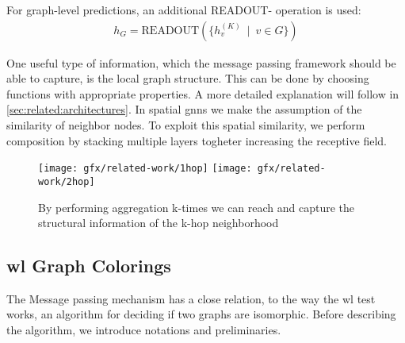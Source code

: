 For graph-level predictions, an additional READOUT- operation is used:
\begin{align*}
    h_{G} =\mathrm{READOUT}(\{h_{v}^{(K)}\ \mid \ v \in G\})
\end{align*}

One useful type of information, which the message passing framework should be able to
capture, is the local graph structure. This can be done by choosing functions with
appropriate properties. A more detailed explanation will follow in
\cref{sec:related:architectures}. In spatial \acp{gnn} we make the assumption of the
similarity of neighbor nodes. To exploit this spatial similarity, we perform
composition by stacking multiple layers togheter increasing the receptive field.

\begin{figure}[ht]
    \centering
    \texttt{[image: gfx/related-work/1hop]}\hspace{1cm}
    \texttt{[image: gfx/related-work/2hop]}
    \caption{By performing aggregation k-times we can reach and capture the
        structural information of the k-hop neighborhood}\label{fig:related:1hop}
\end{figure}


\subsection{\acl{wl} Graph Colorings}
\label{sec:related:character:wl}
The Message passing mechanism has a close relation, to the way the \acf{wl} test ~\cite{Weisfeiler1968,Damke2020,Huang2022} works, an algorithm for deciding if two graphs are isomorphic.
Before describing the algorithm, we introduce notations and preliminaries.\\


